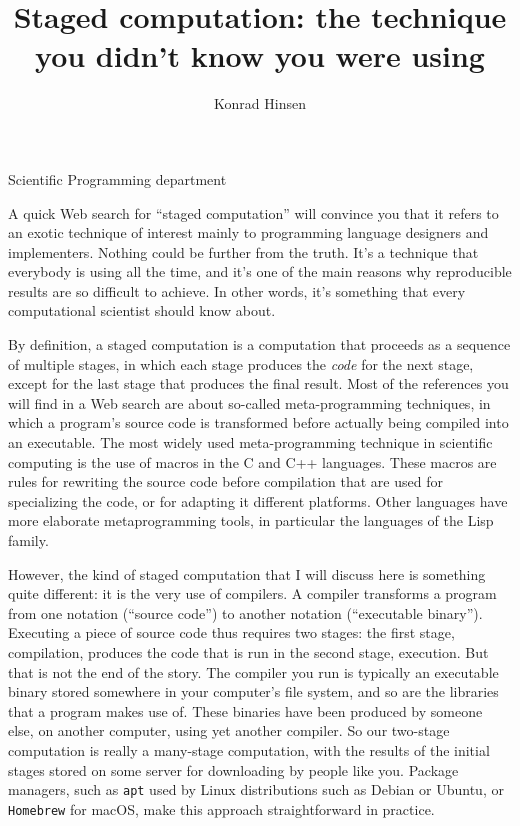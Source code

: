 \documentclass[10pt,journal,compsoc]{IEEEtran}
\begin{document}
\title{Staged computation: the technique you didn't know you were using}

\author{Konrad Hinsen}

%
{Scientific Programming department}
% 
\maketitle

A quick Web search for ``staged computation'' will convince you that it refers to an exotic technique of interest mainly to programming language designers and implementers. Nothing could be further from the truth. It's a technique that everybody is using all the time, and it's one of the main reasons why reproducible results are so difficult to achieve. In other words, it's something that every computational scientist should know about.

\vspace{3mm}

By definition, a staged computation is a computation that proceeds as a sequence of multiple stages, in which each stage produces the \textit{code} for the next stage, except for the last stage that produces the final result. Most of the references you will find in a Web search are about so-called meta-programming techniques, in which a program's source code is transformed before actually being compiled into an executable. The most widely used meta-programming technique in scientific computing is the use of macros in the C and C++ languages. These macros are rules for rewriting the source code before compilation that are used for specializing the code, or for adapting it different platforms. Other languages have more elaborate metaprogramming tools, in particular the languages of the Lisp family.

However, the kind of staged computation that I will discuss here is something quite different: it is the very use of compilers. A compiler transforms a program from one notation (``source code'') to another notation (``executable binary''). Executing a piece of source code thus requires two stages: the first stage, compilation, produces the code that is run in the second stage, execution. But that is not the end of the story. The compiler you run is typically an executable binary stored somewhere in your computer's file system, and so are the libraries that a program makes use of. These binaries have been produced by someone else, on another computer, using yet another compiler. So our two-stage computation is really a many-stage computation, with the results of the initial stages stored on some server for downloading by people like you. Package managers, such as \texttt{apt} used by Linux distributions such as Debian or Ubuntu, or \texttt{Homebrew} for macOS, make this approach straightforward in practice.
\end{document}
